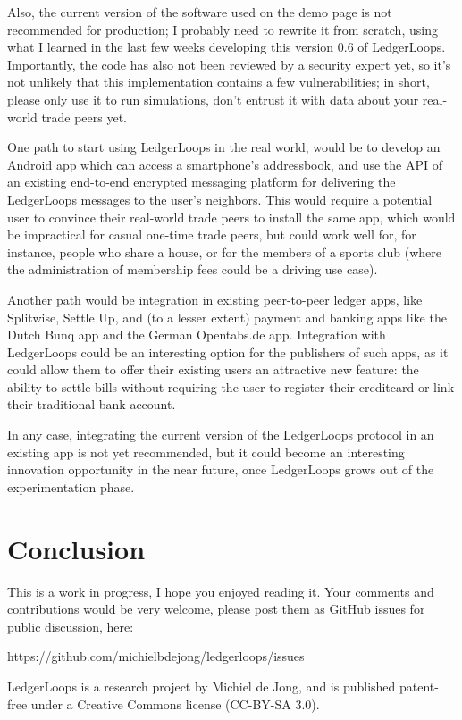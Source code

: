 \documentclass[11pt,twoside,a4paper]{article}
\begin{document}
Also, the current version of the software used on the demo page is not recommended for production; I probably need to rewrite it from scratch, using what I learned in the last few weeks developing this version 0.6 of LedgerLoops. Importantly, the code has also not been reviewed by a security expert yet, so it's not unlikely that this implementation contains a few vulnerabilities; in short, please only use it to run simulations, don't entrust it with data about your real-world trade peers yet.

One path to start using LedgerLoops in the real world, would be to develop an Android app which can access a smartphone's addressbook, and use the API of an existing end-to-end encrypted messaging platform for delivering the LedgerLoops messages to the user's neighbors. This would require a potential user to convince their real-world trade peers to install the same app, which would be impractical for casual one-time trade peers, but could work well for, for instance, people who share a house, or for the members of a sports club (where the administration of membership fees could be a driving use case).

Another path would be integration in existing peer-to-peer ledger apps, like Splitwise, Settle Up, and (to a lesser extent) payment and banking apps like the Dutch Bunq app and the German Opentabs.de app. Integration with LedgerLoops could be an interesting option for the publishers of such apps, as it could allow them to offer their existing users an attractive new feature: the ability to settle bills without requiring the user to register their creditcard or link their traditional bank account.

In any case, integrating the current version of the LedgerLoops protocol in an existing app is not yet recommended, but it could become an interesting innovation opportunity in the near future, once LedgerLoops grows out of the experimentation phase.

\section{Conclusion}
This is a work in progress, I hope you enjoyed reading it. Your comments and contributions would be very welcome, please post them as
GitHub issues for public discussion, here:

https://github.com/michielbdejong/ledgerloops/issues

LedgerLoops is a research project by Michiel de Jong, and is published patent-free under a Creative Commons license (CC-BY-SA 3.0).
\end{document}
